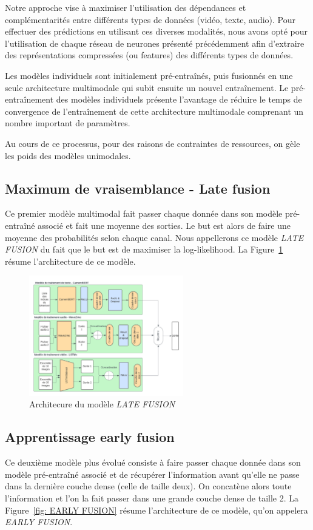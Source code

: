 \documentclass[a4paper]{article}
\begin{document}
Notre approche vise à maximiser l'utilisation des dépendances et complémentarités entre différents types de données (vidéo, texte,
audio). Pour effectuer des prédictions en utilisant ces diverses modalités, nous avons opté pour l'utilisation de chaque réseau de
neurones présenté précédemment afin d'extraire des représentations compressées (ou features) des différents types de données. 

Les modèles individuels sont initialement pré-entraînés, puis fusionnés en une seule architecture multimodale qui subit ensuite un
nouvel entraînement. Le pré-entraînement des modèles individuels présente l'avantage de réduire le temps de convergence de
l'entraînement de cette architecture multimodale comprenant un nombre important de paramètres.

Au cours de ce processus, pour des raisons de contraintes de ressources, on gèle les poids des modèles unimodales.

\subsection{Maximum de vraisemblance - Late fusion}
Ce premier modèle multimodal fait passer chaque donnée dans son modèle pré-entraîné associé et fait une moyenne des sorties. Le but
est alors de faire une moyenne des probabilités selon chaque canal. Nous appellerons ce modèle \textit{LATE FUSION} du fait que le but
est de maximiser la log-likelihood.
La Figure~\ref{fig: LATE FUSION} résume l'architecture de ce modèle.

\begin{figure}[H]
    \centering
    \includegraphics[width=0.6\textwidth]{late_fusion.png}
    \caption{Architecure du modèle \textit{LATE FUSION}}
    \label{fig: LATE FUSION}
\end{figure}

\subsection{Apprentissage early fusion}
Ce deuxième modèle plus évolué consiste à faire passer chaque donnée dans son modèle pré-entraîné associé et de récupérer
l'information avant qu'elle ne passe dans la dernière couche dense (celle de taille deux). On concatène alors toute l'information 
et l'on la fait passer dans une grande couche dense de taille 2.
La Figure~\ref{fig: EARLY FUSION} résume l'architecture de ce modèle, qu'on appelera \textit{EARLY FUSION}.
\end{document}
